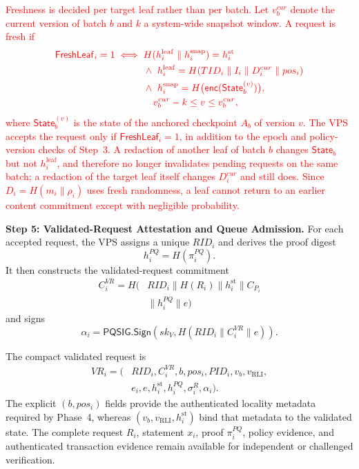 \documentclass[lettersize,journal]{IEEEtran}
\begin{document}
\textcolor{red}{Freshness is decided per target leaf rather than per
batch. Let $v_b^{cur}$ denote the current version of batch $b$ and $k$ a
system-wide snapshot window. A request is fresh if}
\begin{equation}
\textcolor{red}{\begin{aligned}
\mathsf{FreshLeaf}_i=1
\iff{}&
H(h_i^{\mathrm{leaf}}\parallel h_i^{\mathrm{snap}})=h_i^{\mathrm{st}}\\
&\land\
h_i^{\mathrm{leaf}}=H(TID_i\parallel I_i\parallel D_i^{cur}\parallel pos_i)\\
&\land\
h_i^{\mathrm{snap}}=H\big(\mathsf{enc}(\mathsf{State}_b^{(v)})\big),\\
&\phantom{\land\ }
v_b^{cur}-k\le v\le v_b^{cur},
\end{aligned}}
\label{eq:freshleaf}
\end{equation}
\textcolor{red}{where $\mathsf{State}_b^{(v)}$ is the state of the
anchored checkpoint $A_b$ of version $v$. The VPS accepts the request only
if $\mathsf{FreshLeaf}_i=1$, in addition to the epoch and policy-version
checks of Step~3. A redaction of another leaf of batch $b$ changes
$\mathsf{State}_b$ but not $h_i^{\mathrm{leaf}}$, and therefore no longer
invalidates pending requests on the same batch; a redaction of the target
leaf itself changes $D_i^{cur}$ and still does. Since
$D_i=H(m_i\parallel\rho_i)$ uses fresh randomness, a leaf cannot return to
an earlier content commitment except with negligible probability.}

\medskip
\noindent\textbf{Step 5: Validated-Request Attestation and Queue
Admission.}
For each accepted request, the VPS assigns a unique $RID_i$ and derives
the proof digest
\begin{equation}
h_i^{PQ}=H(\pi_i^{PQ}).
\end{equation}
It then constructs the validated-request commitment
\begin{equation}
\begin{aligned}
C_i^{VR}
=
H\big(&RID_i\parallel H(R_i)
\parallel h_i^{\mathrm{st}}
\parallel C_{P_i}\\
&\parallel h_i^{PQ}
\parallel e\big)
\end{aligned}
\end{equation}
and signs
\begin{equation}
\alpha_i=
\mathsf{PQSIG.Sign}
\left(
sk_V,
H(RID_i\parallel C_i^{VR}\parallel e)
\right).
\end{equation}

The compact validated request is
\begin{equation}
\begin{aligned}
VR_i=\big(&RID_i,C_i^{VR},b,pos_i,PID_i,
v_b,v_{\mathrm{RLI}},\\
&e_i,e,h_i^{\mathrm{st}},h_i^{PQ},
\sigma_i^R,\alpha_i\big).
\end{aligned}
\end{equation}
The explicit $(b,pos_i)$ fields provide the authenticated locality
metadata required by Phase~4, whereas
$(v_b,v_{\mathrm{RLI}},h_i^{\mathrm{st}})$ bind that metadata to the
validated state. The complete request $R_i$, statement $x_i$, proof
$\pi_i^{PQ}$, policy evidence, and authenticated transaction evidence
remain available for independent or challenged verification.
\end{document}
